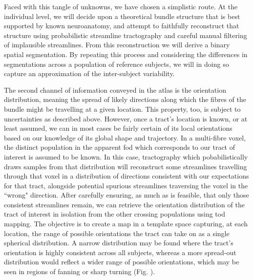 Faced with this tangle of unknowns, we have chosen a simplistic route.
At the individual level, we will decide upon a theoretical bundle structure that is best supported by known neuroanatomy, and attempt to faithfully reconstruct that structure using probabilistic streamline tractography and careful manual filtering of implausible streamlines.
From this reconstruction we will derive a binary spatial segmentation. 
By repeating this process and considering the differences in segmentations across a population of reference subjects, we will in doing so capture an approximation of the inter-subject variability.


The second channel of information conveyed in the atlas is the orientation distribution, meaning the spread of likely directions along which the fibres of the bundle might be travelling at a given location.
This property, too, is subject to uncertainties as described above.
However, once a tract's location is known, or at least assumed, we can in most cases be fairly certain of its local orientations based on our knowledge of its global shape and trajectory.
In a multi-fibre voxel, the distinct population in the apparent \gls{fod} which corresponds to our tract of interest is assumed to be known.
In this case, tractography which pobabilistically draws samples from that distribution will reconstruct some streamlines travelling through that voxel in a distribution of directions consistent with our expectations for that tract, alongside potential spurious streamlines traversing the voxel in the ``wrong" direction.
After carefully ensuring, as much as is feasible, that only those consistent streamlines remain, we can retrieve the orientation distribution of the tract of interest in isolation from the other crossing populations using \gls{tod} mapping.
The objective is to create a map in a template space capturing, at each location, the range of possible orientations the tract can take on as a single spherical distribution.
A narrow distribution may be found where the tract's orientation is highly consistent across all subjects, whereas a more spread-out distribution would reflect a wider range of possible orientations, which may be seen in regions of fanning or sharp turning (Fig. ).

